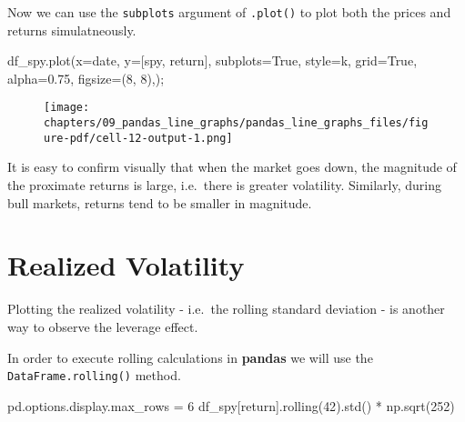\documentclass[
  letterpaper,
  DIV=11,
  numbers=noendperiod]{scrreprt}
\newenvironment{Shaded}{\begin{snugshade}}{\end{snugshade}}
\newcommand{\DecValTok}[1]{\textcolor[rgb]{0.68,0.00,0.00}{#1}}
\newcommand{\FloatTok}[1]{\textcolor[rgb]{0.68,0.00,0.00}{#1}}
\newcommand{\NormalTok}[1]{\textcolor[rgb]{0.00,0.23,0.31}{#1}}
\newcommand{\OperatorTok}[1]{\textcolor[rgb]{0.37,0.37,0.37}{#1}}
\newcommand{\StringTok}[1]{\textcolor[rgb]{0.13,0.47,0.30}{#1}}
\newcommand{\VariableTok}[1]{\textcolor[rgb]{0.07,0.07,0.07}{#1}}
\begin{document}
Now we can use the \texttt{subplots} argument of \texttt{.plot()} to
plot both the prices and returns simulatneously.

\begin{Shaded}
\begin{Highlighting}[]
\NormalTok{df\_spy.plot(x}\OperatorTok{=}\StringTok{\textquotesingle{}date\textquotesingle{}}\NormalTok{, y}\OperatorTok{=}\NormalTok{[}\StringTok{\textquotesingle{}spy\textquotesingle{}}\NormalTok{, }\StringTok{\textquotesingle{}return\textquotesingle{}}\NormalTok{], subplots}\OperatorTok{=}\VariableTok{True}\NormalTok{, style}\OperatorTok{=}\StringTok{\textquotesingle{}k\textquotesingle{}}\NormalTok{, grid}\OperatorTok{=}\VariableTok{True}\NormalTok{, alpha}\OperatorTok{=}\FloatTok{0.75}\NormalTok{, figsize}\OperatorTok{=}\NormalTok{(}\DecValTok{8}\NormalTok{, }\DecValTok{8}\NormalTok{),)}\OperatorTok{;}
\end{Highlighting}
\end{Shaded}

\begin{figure}[H]

{\centering \texttt{[image: chapters/09\_pandas\_line\_graphs/pandas\_line\_graphs\_files/figure-pdf/cell-12-output-1.png]}

}

\end{figure}

It is easy to confirm visually that when the market goes down, the
magnitude of the proximate returns is large, i.e.~there is greater
volatility. Similarly, during bull markets, returns tend to be smaller
in magnitude.

\hypertarget{realized-volatility}{%
\section{Realized Volatility}\label{realized-volatility}}

Plotting the realized volatility - i.e.~the rolling standard deviation -
is another way to observe the leverage effect.

In order to execute rolling calculations in \textbf{pandas} we will use
the \texttt{DataFrame.rolling()} method.

\begin{Shaded}
\begin{Highlighting}[]
\NormalTok{pd.options.display.max\_rows }\OperatorTok{=} \DecValTok{6}
\NormalTok{df\_spy[}\StringTok{\textquotesingle{}return\textquotesingle{}}\NormalTok{].rolling(}\DecValTok{42}\NormalTok{).std() }\OperatorTok{*}\NormalTok{ np.sqrt(}\DecValTok{252}\NormalTok{)}
\end{Highlighting}
\end{Shaded}
\end{document}
